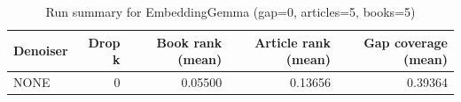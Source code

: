 \begin{table}
\caption{Run summary for EmbeddingGemma (gap=0, articles=5, books=5)}
\label{tab:summary_gap0_embeddinggemma_a5_b5}
\begin{tabular}{lrrrr}
\toprule
Denoiser & Drop k & Book rank (mean) & Article rank (mean) & Gap coverage (mean) \\
\midrule
NONE & 0 & 0.05500 & 0.13656 & 0.39364 \\
\bottomrule
\end{tabular}
\end{table}